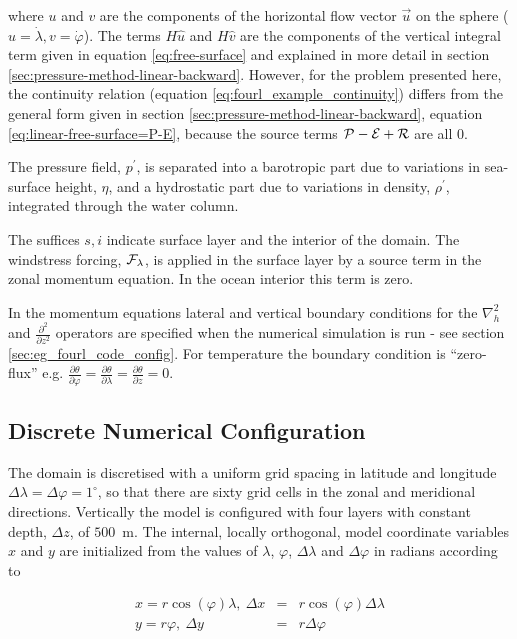 \noindent where $u$ and $v$ are the components of the horizontal
flow vector $\vec{u}$ on the sphere ($u=\dot{\lambda},v=\dot{\varphi}$).
The terms $H\widehat{u}$ and $H\widehat{v}$ are the components of the vertical
integral term given in equation \ref{eq:free-surface} and
explained in more detail in section \ref{sec:pressure-method-linear-backward}.
However, for the problem presented here, the continuity relation (equation
\ref{eq:fourl_example_continuity}) differs from the general form given
in section \ref{sec:pressure-method-linear-backward},
equation \ref{eq:linear-free-surface=P-E}, because the source terms
${\cal P}-{\cal E}+{\cal R}$ 
are all $0$.

The pressure field, $p^{\prime}$, is separated into a barotropic part
due to variations in sea-surface height, $\eta$, and a hydrostatic
part due to variations in density, $\rho^{\prime}$, integrated
through the water column.

The suffices ${s},{i}$ indicate surface layer and the interior of the domain.
The windstress forcing, ${\cal F}_{\lambda}$, is applied in the surface layer 
by a source term in the zonal momentum equation. In the ocean interior
this term is zero.

In the momentum equations
lateral and vertical boundary conditions for the $\nabla_{h}^{2}$
and $\frac{\partial^{2}}{\partial z^{2}}$ operators are specified
when the numerical simulation is run - see section 
\ref{sec:eg_fourl_code_config}. For temperature
the boundary condition is ``zero-flux'' 
e.g. $\frac{\partial \theta}{\partial \varphi}=
\frac{\partial \theta}{\partial \lambda}=\frac{\partial \theta}{\partial z}=0$.



\subsection{Discrete Numerical Configuration}

 The domain is discretised with 
a uniform grid spacing in latitude and longitude
 $\Delta \lambda=\Delta \varphi=1^{\circ}$, so 
that there are sixty grid cells in the zonal and meridional directions. 
Vertically the 
model is configured with four layers with constant depth, 
$\Delta z$, of $500$~m. The internal, locally orthogonal, model coordinate 
variables $x$ and $y$ are initialized from the values of
$\lambda$, $\varphi$, $\Delta \lambda$ and $\Delta \varphi$ in
radians according to

\begin{eqnarray}
x=r\cos(\varphi)\lambda,~\Delta x & = &r\cos(\varphi)\Delta \lambda \\
y=r\varphi,~\Delta y &= &r\Delta \varphi
\end{eqnarray}

